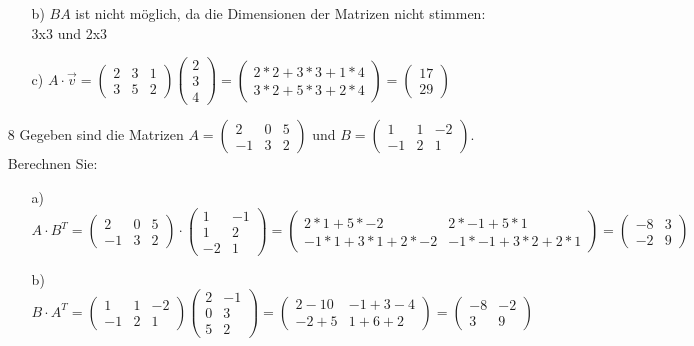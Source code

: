 \documentclass{article}
\begin{document}
\begin{itemize}
\begin{itemize}
			\item[b)]{$BA$ ist nicht möglich, da die Dimensionen der Matrizen nicht stimmen: 3x3 und 2x3}
			\item[c)]{$A\cdot \vec{v}=\begin{pmatrix} 2 & 3 & 1 \\ 3 & 5 & 2 \end{pmatrix}\begin{pmatrix} 2 \\ 3 \\ 4 \end{pmatrix}=\begin{pmatrix} 2*2+3*3+1*4 \\ 3*2+5*3+2*4 \end{pmatrix}=\begin{pmatrix} 17 \\ 29 \end{pmatrix}$}
		\end{itemize}
		\item[8]{Gegeben sind die Matrizen $A=\begin{pmatrix} 2 & 0 & 5 \\ -1 & 3 & 2 \end{pmatrix}$ und $B=\begin{pmatrix} 1 & 1 & -2 \\ -1 & 2 & 1 \end{pmatrix}$. Berechnen Sie:}
		\begin{itemize}
			\item[a)]{$A\cdot B^T=\begin{pmatrix} 2 & 0 & 5 \\ -1 & 3 & 2 \end{pmatrix}\cdot \begin{pmatrix} 1 & -1 \\ 1 & 2 \\ -2 & 1 \end{pmatrix}=\begin{pmatrix} 2*1+5*-2 & 2*-1+5*1 \\ -1*1+3*1+2*-2 & -1*-1+3*2+2*1 \end{pmatrix}=\begin{pmatrix} -8 & 3 \\ -2 & 9 \end{pmatrix}$}
			\item[b)]{$B\cdot A^T=\begin{pmatrix} 1 & 1 & -2 \\ -1 & 2 & 1 \end{pmatrix}\begin{pmatrix} 2 & -1 \\ 0 & 3 \\ 5 & 2 \end{pmatrix}=\begin{pmatrix} 2-10 & -1+3-4 \\ -2+5 & 1+6+2 \end{pmatrix}=\begin{pmatrix} -8 & -2 \\ 3 & 9 \end{pmatrix}$}

\end{itemize}
\end{itemize}
\end{document}

